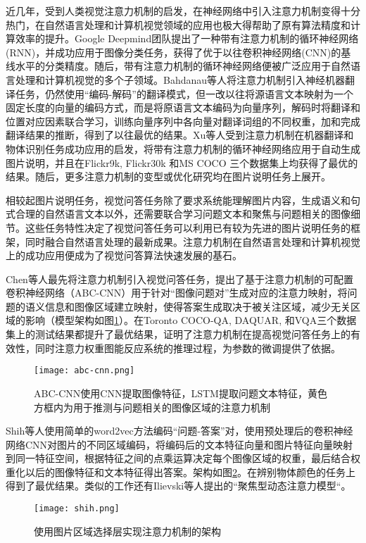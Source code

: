 近几年，受到人类视觉注意力机制的启发，在神经网络中引入注意力机制变得十分热门，在自然语言处理和计算机视觉领域的应用也极大得帮助了原有算法精度和计算效率的提升。Google Deepmind团队提出了一种带有注意力机制的循环神经网络(RNN)，并成功应用于图像分类任务，获得了优于以往卷积神经网络(CNN)的基线水平的分类精度。随后，带有注意力机制的循环神经网络便被广泛应用于自然语言处理和计算机视觉的多个子领域。Bahdanau等人将注意力机制引入神经机器翻译任务，仍然使用“编码-解码”的翻译模式，但一改以往将源语言文本映射为一个固定长度的向量的编码方式，而是将原语言文本编码为向量序列，解码时将翻译和位置对应因素联合学习，训练向量序列中各向量对翻译词组的不同权重，加和完成翻译结果的推断，得到了以往最优的结果。Xu等人受到注意力机制在机器翻译和物体识别任务成功应用的启发，将带有注意力机制的循环神经网络应用于自动生成图片说明，并且在Flickr9k, Flickr30k 和MS COCO 三个数据集上均获得了最优的结果。随后，更多注意力机制的变型或优化研究均在图片说明任务上展开。

相较起图片说明任务，视觉问答任务除了要求系统能理解图片内容，生成语义和句式合理的自然语言文本以外，还需要联合学习问题文本和聚焦与问题相关的图像细节。这些任务特性决定了视觉问答任务可以利用已有较为先进的图片说明任务的框架，同时融合自然语言处理的最新成果。注意力机制在自然语言处理和计算机视觉上的成功应用便成为了视觉问答算法快速发展的基石。

Chen等人最先将注意力机制引入视觉问答任务，提出了基于注意力机制的可配置卷积神经网络（ABC-CNN）用于针对“图像问题对”生成对应的注意力映射，将问题的语义信息和图像区域建立映射，使得答案生成取决于被关注区域，减少无关区域的影响（模型架构如图\ref{abc-cnn}）。在Toronto COCO-QA, DAQUAR, 和VQA三个数据集上的测试结果都提升了最优结果，证明了注意力机制在提高视觉问答任务上的有效性，同时注意力权重图能反应系统的推理过程，为参数的微调提供了依据。
\begin{figure}[H]
	\centering
	\texttt{[image: abc-cnn.png]}
	\caption{ABC-CNN使用CNN提取图像特征，LSTM提取问题文本特征，黄色方框内为用于推测与问题相关的图像区域的注意力机制}
	\label{abc-cnn}
\end{figure}

Shih等人使用简单的word2vec方法编码“问题-答案”对，使用预处理后的卷积神经网络CNN对图片的不同区域编码，将编码后的文本特征向量和图片特征向量映射到同一特征空间，根据特征之间的点乘运算决定每个图像区域的权重，最后结合权重化以后的图像特征和文本特征得出答案。架构如图\ref{shih}。在辨别物体颜色的任务上得到了最优结果。类似的工作还有Ilievski等人提出的“聚焦型动态注意力模型“。
\begin{figure}[H]
	\centering
	\texttt{[image: shih.png]}
	\caption{使用图片区域选择层实现注意力机制的架构}
	\label{shih}
\end{figure}

